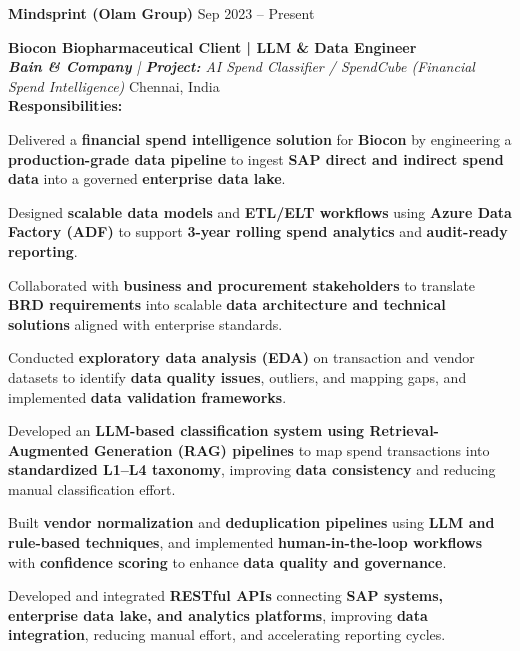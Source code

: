 \textcolor[RGB]{0,128,128}{\textbf{\large Mindsprint (Olam Group)}} \hfill Sep 2023 -- Present\\

\begin{list}{}{\setlength{\leftmargin}{1em}}

\textcolor[RGB]{0,128,128}{\textbf{\large Biocon Biopharmaceutical Client | LLM \& Data Engineer}} \\
\textit{\textcolor[RGB]{203,32,38}{\textbf{Bain \& Company}} | {\textbf{Project:}} AI Spend Classifier / SpendCube (Financial Spend Intelligence)} \hfill Chennai, India \\

\textbf{Responsibilities:}
\vspace{-0.5em}
\begin{zitemize}
    \item Delivered a \textbf{financial spend intelligence solution} for \textbf{Biocon} by engineering a \textbf{production-grade data pipeline} to ingest \textbf{SAP direct and indirect spend data} into a governed \textbf{enterprise data lake}.
    \item Designed \textbf{scalable data models} and \textbf{ETL/ELT workflows} using \textbf{Azure Data Factory (ADF)} to support \textbf{3-year rolling spend analytics} and \textbf{audit-ready reporting}.
    \item Collaborated with \textbf{business and procurement stakeholders} to translate \textbf{BRD requirements} into scalable \textbf{data architecture and technical solutions} aligned with enterprise standards.
    \item Conducted \textbf{exploratory data analysis (EDA)} on transaction and vendor datasets to identify \textbf{data quality issues}, outliers, and mapping gaps, and implemented \textbf{data validation frameworks}.
    \item Developed an \textbf{LLM-based classification system using Retrieval-Augmented Generation (RAG) pipelines} to map spend transactions into \textbf{standardized L1--L4 taxonomy}, improving \textbf{data consistency} and reducing manual classification effort.
    \item Built \textbf{vendor normalization} and \textbf{deduplication pipelines} using \textbf{LLM and rule-based techniques}, and implemented \textbf{human-in-the-loop workflows} with \textbf{confidence scoring} to enhance \textbf{data quality and governance}.
    \item Developed and integrated \textbf{RESTful APIs} connecting \textbf{SAP systems, enterprise data lake, and analytics platforms}, improving \textbf{data integration}, reducing manual effort, and accelerating reporting cycles.
\end{zitemize}


\end{list}
